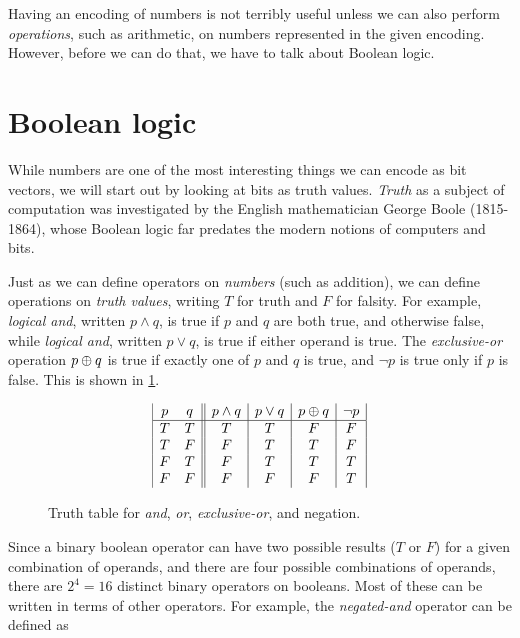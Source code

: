 Having an encoding of numbers is not terribly useful unless we can
also perform \emph{operations}, such as arithmetic, on numbers
represented in the given encoding.  However, before we can do that, we
have to talk about Boolean logic.

\section{Boolean logic}
\label{sec:boolean-logic}

While numbers are one of the most interesting things we can encode as
bit vectors, we will start out by looking at bits as truth values.
\emph{Truth} as a subject of computation was investigated by the
English mathematician George Boole (1815-1864), whose Boolean logic
far predates the modern notions of computers and bits.

Just as we can define operators on \emph{numbers} (such as addition),
we can define operations on \emph{truth values}, writing $T$ for truth
and $F$ for falsity.  For example, \emph{logical and}, written
$p \land q$, is true if $p$ and $q$ are both true, and otherwise
false, while \emph{logical and}, written $p \lor q$, is true if either
operand is true.  The \emph{exclusive-or} operation $p \oplus q$ is
true if exactly one of $p$ and $q$ is true, and $\neg p$ is true only
if $p$ is false.  This is shown in \cref{fig:truth-tables}.

\begin{figure}
  \centering

  \begin{displaymath}
\begin{array}{|c c||c|c|c|c|}
p & q & p \land q & p \lor q & p \oplus q & \neg p \\
\hline
T & T & T & T & F & F\\
T & F & F & T & T & F\\
F & T & F & T & T & T\\
F & F & F & F & F & T\\
\end{array}
\end{displaymath}
  \caption{Truth table for \emph{and}, \emph{or}, \emph{exclusive-or}, and negation.}
  \label{fig:truth-tables}
\end{figure}


Since a binary boolean operator can have two possible results ($T$ or
$F$) for a given combination of operands, and there are four possible
combinations of operands, there are $2^{4}=16$ distinct binary
operators on booleans.  Most of these can be written in terms of other
operators.  For example, the \emph{negated-and} operator can be defined as

